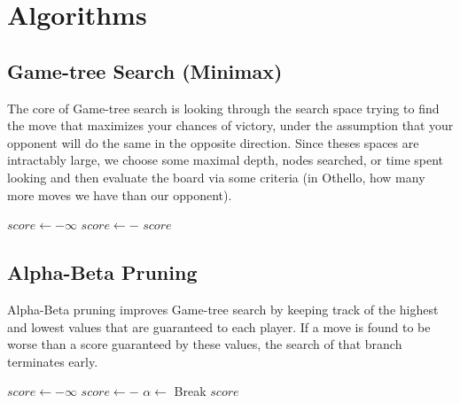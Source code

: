 \documentclass[]{article}
\begin{document}
\section{Algorithms}
\subsection{Game-tree Search (Minimax)}
The core of Game-tree search is looking through the search space trying to find the move that maximizes
your chances of victory, under the assumption that your opponent will do the same in the opposite direction.
Since theses spaces are intractably large, we choose some maximal depth, nodes searched, or time spent looking
and then evaluate the board via some criteria (in Othello, how many more moves we have than our opponent).
\begin{algorithmic}[1]
  \State \Return {}
  \Else
  \State $score \gets -\infty$
  \State $score \gets -$ 
  \EndFor
  \State \Return $score$
  \EndIf
  \EndProcedure
\end{algorithmic}
\subsection{Alpha-Beta Pruning}
Alpha-Beta pruning improves Game-tree search by keeping track of the highest and lowest values that
are guaranteed to each player. If a move is found to be worse than a score guaranteed by these values, the search
of that branch terminates early.
\begin{algorithmic}[1]
  \State \Return {}
  \Else
  \State $score \gets -\infty$
  \State $score \gets -$ 
  \State $\alpha \gets $ 
  \If{$\alpha \geq \beta$}
  \State Break
  \EndIf
  \EndFor
  \State \Return $score$
  \EndIf
  \EndProcedure
\end{algorithmic}
\end{document}
